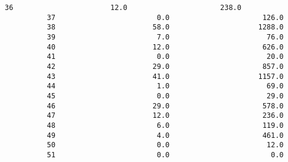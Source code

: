 \documentclass[11pt]{article}
\begin{document}
\begin{Verbatim}[commandchars=\\\{\}]
          36                       12.0                      238.0   
          37                        0.0                      126.0   
          38                       58.0                     1288.0   
          39                        7.0                       76.0   
          40                       12.0                      626.0   
          41                        0.0                       20.0   
          42                       29.0                      857.0   
          43                       41.0                     1157.0   
          44                        1.0                       69.0   
          45                        0.0                       29.0   
          46                       29.0                      578.0   
          47                       12.0                      236.0   
          48                        6.0                      119.0   
          49                        4.0                      461.0   
          50                        0.0                       12.0   
          51                        0.0                        0.0   
          

\end{Verbatim}
\end{document}

